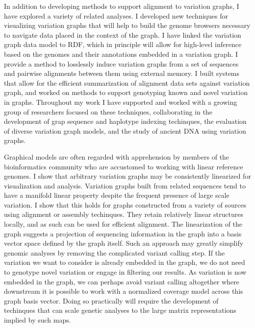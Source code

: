 In addition to developing methods to support alignment to variation graphs, I have explored a variety of related analyses.
I developed new techniques for visualizing variation graphs that will help to build the genome browsers necessary to navigate data placed in the context of the graph.
I have linked the variation graph data model to RDF, which in principle will allow for high-level inference based on the genomes and their annotations embedded in a variation graph. 
I provide a method to losslessly induce variation graphs from a set of sequences and pairwise alignments between them using external memory.
I built systems that allow for the efficient summarization of alignment data sets against variation graph, and worked on methods to support genotyping known and novel variation in graphs.
Throughout my work I have supported and worked with a growing group of researchers focused on these techniques, collaborating in the development of grap sequence and haplotype indexing techinques, the evaluation of diverse variation graph models, and the study of ancient DNA using variation graphs.

Graphical models are often regarded with apprehension by members of the bioinformatics community who are accustomed to working with linear reference genomes.
I show that arbitrary variation graphs may be consistently linearized for visualization and analysis.
Variation graphs built from related sequences tend to have a manifold linear property despite the frequent presence of large scale variation.
I show that this holds for graphs constructed from a variety of sources using alignment or assembly techinques.
They retain relatively linear structures locally, and as such can be used for efficient alignment.
The linearization of the graph suggests a projection of sequencing information in the graph into a basis vector space defined by the graph itself.
Such an approach may greatly simplify genomic analyses by removing the complicated variant calling step.
If the variation we want to consider is already embedded in the graph, we do not need to genotype novel variation or engage in filtering our results.
As variation is now embedded in the graph, we can perhaps avoid variant calling altogether where downstream it is possible to work with a normalized coverage model across this graph basis vector.
Doing so practically will require the development of techinques that can scale genetic analyses to the large matrix representations implied by such maps.

